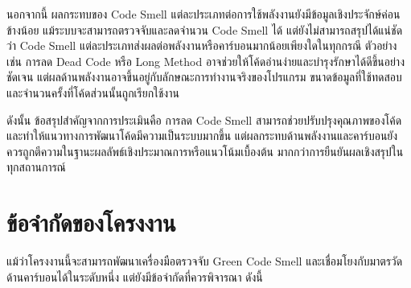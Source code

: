 นอกจากนี้ ผลกระทบของ Code Smell แต่ละประเภทต่อการใช้พลังงานยังมีข้อมูลเชิงประจักษ์ค่อนข้างน้อย แม้ระบบจะสามารถตรวจจับและลดจำนวน Code Smell ได้ แต่ยังไม่สามารถสรุปได้แน่ชัดว่า Code Smell แต่ละประเภทส่งผลต่อพลังงานหรือคาร์บอนมากน้อยเพียงใดในทุกกรณี ตัวอย่างเช่น การลด Dead Code หรือ Long Method อาจช่วยให้โค้ดอ่านง่ายและบำรุงรักษาได้ดีขึ้นอย่างชัดเจน แต่ผลด้านพลังงานอาจขึ้นอยู่กับลักษณะการทำงานจริงของโปรแกรม ขนาดข้อมูลที่ใช้ทดสอบ และจำนวนครั้งที่โค้ดส่วนนั้นถูกเรียกใช้งาน

ดังนั้น ข้อสรุปสำคัญจากการประเมินคือ การลด Code Smell สามารถช่วยปรับปรุงคุณภาพของโค้ดและทำให้แนวทางการพัฒนาโค้ดมีความเป็นระบบมากขึ้น แต่ผลกระทบด้านพลังงานและคาร์บอนยังควรถูกตีความในฐานะผลลัพธ์เชิงประมาณการหรือแนวโน้มเบื้องต้น มากกว่าการยืนยันผลเชิงสรุปในทุกสถานการณ์


\section{ข้อจำกัดของโครงงาน}

แม้ว่าโครงงานนี้จะสามารถพัฒนาเครื่องมือตรวจจับ Green Code Smell และเชื่อมโยงกับมาตรวัดด้านคาร์บอนได้ในระดับหนึ่ง แต่ยังมีข้อจำกัดที่ควรพิจารณา ดังนี้

